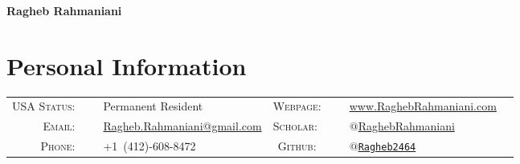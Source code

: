 \documentclass[10PT,letter]{article}
\title{}
\newcommand{\numbox}[1]{} %
\begin{document}
\noindent{}%
{
	\fontsize{34}{36}\mdseries\upshape\sffamily\bfseries Ragheb Rahmaniani
}

\vspace{1.0cm}

\section*{\numbox{1}\bfseries\textcolor{titlecol}{\sffamily Personal Information}}
              \begin{tabular}{rlcrl}
	               \small\textsc{USA Status:}~~~ & \small Permanent Resident 	
	               																					& \small\textsc{Webpage:}~~~ &  \multicolumn{1}{l}{
	               																						\small \href{http://www.raghebrahmaniani.com/}{{www.RaghebRahmaniani.com }}
	               																					}
	               \\[.5mm]
	               
	                \small\textsc{Email:}~~~ & \small {\href{mailto:ragheb.rahmaniani@gmail.com}{Ragheb.Rahmaniani@gmail.com}}   
	                																				& \small\textsc{Scholar:} ~~~ &  \multicolumn{1}{l}{
	                																					\small  \small\href{https://scholar.google.com/citations?user=3V2o0Q0AAAAJ\&hl=en}{$@$RaghebRahmaniani}
	                																				}
	                \\[.5mm]
	                \small\textsc{Phone:}~~~ & \small +1~(412)-608-8472   
	                																				&  \small\textsc{Github:}~~~ & \multicolumn{1}{l}{
	                																					\small \small\href{https://github.com/Ragheb2464}{\texttt{$@$Ragheb2464}}  
                																					}
					\\[.5mm]	               
              \end{tabular}
\end{document}
